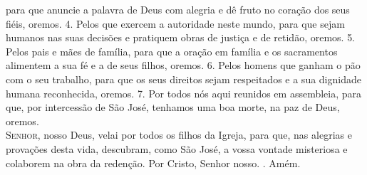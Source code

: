 \documentclass{book}
\begin{document}
\begin{flushleft}
    para que anuncie a palavra de Deus com alegria
    \newline
    e dê fruto no coração dos seus fiéis,
    \newline
    oremos.
    \vspace{.2cm}
    \newline
    {\color{VioletRed2} 4.} Pelos que exercem a autoridade neste mundo,
    \newline
    para que sejam humanos nas suas decisões
    \newline
    e pratiquem obras de justiça e de retidão,
    \newline
    oremos.
    \vspace{.2cm}
    \newline
    {\color{VioletRed2} 5.} Pelos pais e mães de família,
    \newline
    para que a oração em família e os sacramentos
    \newline
    alimentem a sua fé e a de seus filhos,
    \newline
    oremos.
    \vspace{.2cm}
    \newline
    {\color{VioletRed2} 6.} Pelos homens que ganham o pão com o seu trabalho,
    \newline
    para que os seus direitos sejam respeitados
    \newline
    e a sua dignidade humana reconhecida,
    \newline
    oremos.
    \vspace{.2cm}
    \newline
    {\color{VioletRed2} 7.} Por todos nós aqui reunidos em assembleia,
    \newline
    para que, por intercessão de São José,
    \newline
    tenhamos uma boa morte, na paz de Deus,
    \newline
    oremos.
    \vspace{.2cm} \\
    \lettrine[findent=2pt]{\color{VioletRed2}S}{enhor}, nosso Deus, velai por todos os filhos da Igreja,
    \newline
    para que, nas alegrias e provações desta vida,
    \newline
    descubram, como São José, a vossa vontade misteriosa
    \newline
    e colaborem na obra da redenção.
    \newline
    Por Cristo, Senhor nosso.
    \newline
    {\color{VioletRed2} \Rbar.} Amém.
\end{flushleft}
\end{document}
